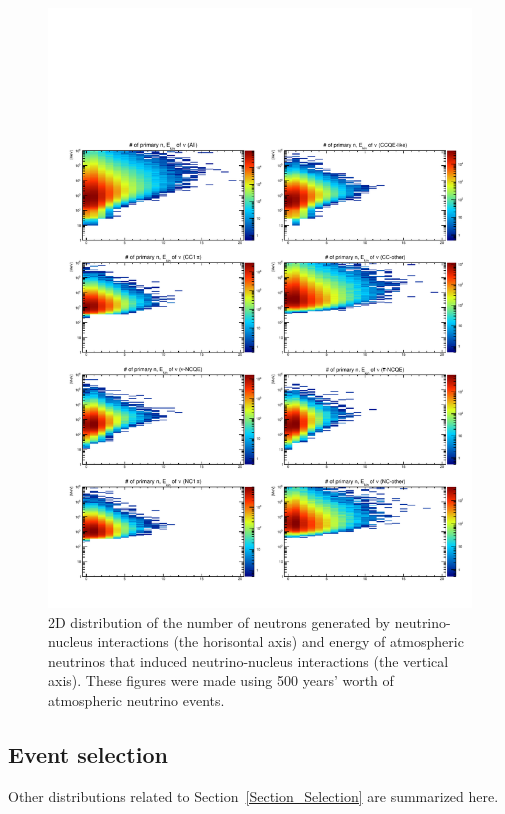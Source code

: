 \begin{figure}[h]
	\centering
	\includegraphics[width=16cm]{PDF/NEUT/s1_2_official/neutron_2D/Logz_NumPri_LogEneNeu}
	\caption[2D distribution of the number of neutrons generated by neutrino-nucleus interactions and energy of atmospheric neutrinos that induced neutrino-nucleus interactions]{
	2D distribution of the number of neutrons generated by neutrino-nucleus interactions (the horisontal axis) and energy of atmospheric neutrinos that induced neutrino-nucleus interactions (the vertical axis).
	These figures were made using 500 years' worth of atmospheric neutrino events.
	}\label{neutron_2DLogz_NumPri_LogEneNeu}
\end{figure}





\clearpage
\subsection{Event selection}\label{App_Selection}
\vs\hs
Other distributions related to Section~\ref{Section_Selection} are summarized here.

